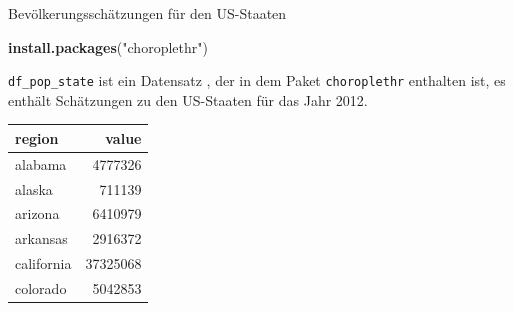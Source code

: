 \documentclass[ignorenonframetext,]{beamer}
\newenvironment{Shaded}{\begin{snugshade}}{\end{snugshade}}
\newcommand{\KeywordTok}[1]{\textcolor[rgb]{0.13,0.29,0.53}{\textbf{#1}}}
\newcommand{\StringTok}[1]{\textcolor[rgb]{0.31,0.60,0.02}{#1}}
\newcommand{\NormalTok}[1]{#1}
\begin{document}
\begin{frame}[fragile]{Bevölkerungsschätzungen für den US-Staaten}

\begin{Shaded}
\begin{Highlighting}[]
\KeywordTok{install.packages}\NormalTok{(}\StringTok{"choroplethr"}\NormalTok{)}
\end{Highlighting}
\end{Shaded}

\texttt{df\_pop\_state} ist ein Datensatz , der in dem Paket
\texttt{choroplethr} enthalten ist, es enthält Schätzungen zu den
US-Staaten für das Jahr 2012.

\begin{longtable}[]{@{}lr@{}}
\toprule
region & value\tabularnewline
\midrule
\endhead
alabama & 4777326\tabularnewline
alaska & 711139\tabularnewline
arizona & 6410979\tabularnewline
arkansas & 2916372\tabularnewline
california & 37325068\tabularnewline
colorado & 5042853\tabularnewline
\bottomrule
\end{longtable}

\end{frame}
\end{document}
